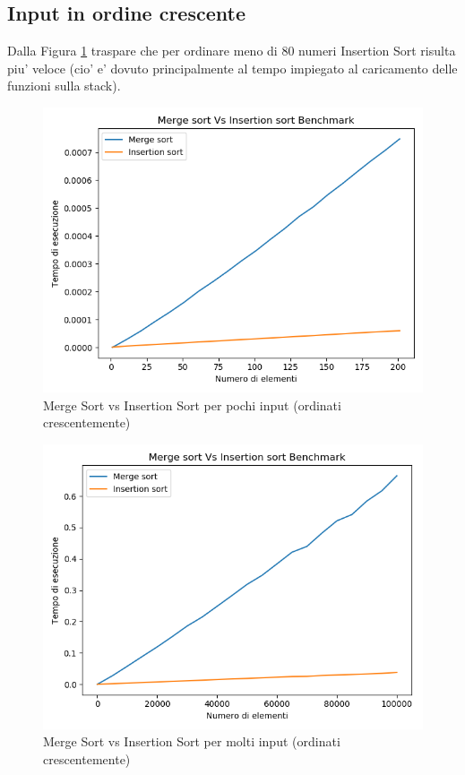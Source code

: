 \documentclass[a4paper]{article}
\begin{document}
\subsection{Input in ordine crescente}
Dalla Figura \ref{fig:SmallInsMergeCresc} traspare che per ordinare meno di 80 numeri Insertion Sort risulta piu' veloce (cio' e' dovuto principalmente al tempo impiegato al caricamento delle funzioni sulla stack).	

 
		\begin{figure}[!htb]
		\centering
		\includegraphics[scale=0.3]{2}
		\caption{Merge Sort vs Insertion Sort per pochi input (ordinati crescentemente)}
		\label{fig:SmallInsMergeCresc}
		\end{figure}
		
		\begin{figure}[!htb]
		\centering
		\includegraphics[scale=0.3]{1}
		\caption{Merge Sort vs Insertion Sort per molti input (ordinati crescentemente)}
		\label{fig:BigInsMergeCresc}
		\end{figure}
		
\end{document}

